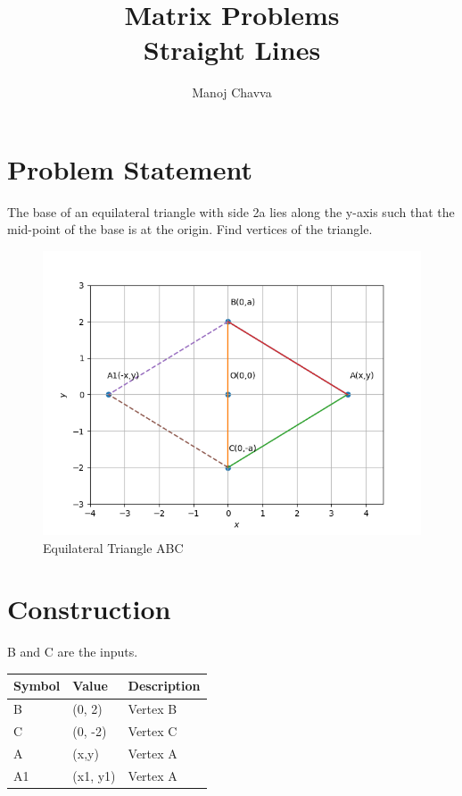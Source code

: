 \documentclass[journal,12pt,twocolumn]{IEEEtran}
\title{Matrix Problems \textbf{\\Straight Lines }}
\author{Manoj Chavva}
\begin{document}
\maketitle



\section{Problem Statement}

\noindent The base of an equilateral triangle with side 2a lies along the y-axis such that the mid-point of the base is at the origin. Find vertices of the triangle.


\begin{figure}[h]
\includegraphics[width=1\columnwidth]{triangle.png}
\caption{Equilateral Triangle ABC}
\label{fig:triangle}
\end{figure}

\section{Construction}
B and C are the inputs.
\begin{table}[h]
\centering
\large
\begin{tabular}{|l|l|l|}
\hline
\textbf{Symbol} & \textbf{Value} & \textbf{Description} \\ \hline
B               & (0, 2)         & Vertex B             \\ \hline
C               & (0, -2)        & Vertex C             \\ \hline
A               & (x,y)          & Vertex A             \\ \hline
A1              & (x1, y1)       & Vertex A             \\ \hline
\end{tabular}
\end{table}
\end{document}
